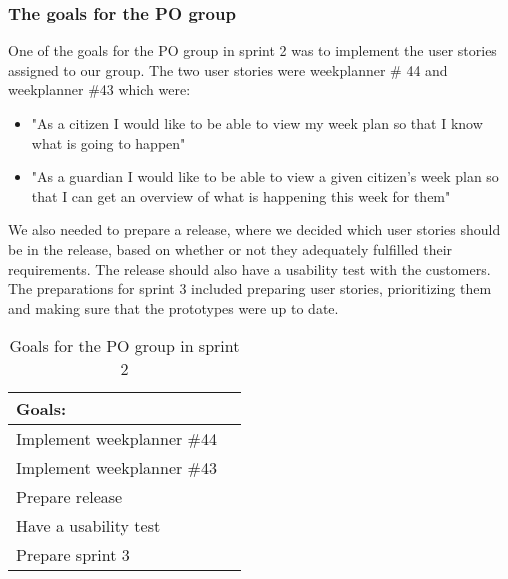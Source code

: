\subsubsection{The goals for the PO group}
One of the goals for the PO group in sprint 2 was to implement the user stories assigned to our group.
The two user stories were weekplanner \# 44 and weekplanner \#43 which were:
\begin{itemize}
 \item "As a citizen I would like to be able to view my week plan so that I know what is going to happen" 
 \item "As a guardian I would like to be able to view a given citizen's week plan so that I can get an overview of what is happening this week for them"
\end{itemize}
We also needed to prepare a release, where we decided which user stories should be in the release, based on whether or not they adequately fulfilled their requirements.
The release should also have a usability test with the customers.
The preparations for sprint 3 included preparing user stories, prioritizing them and making sure that the prototypes were up to date.
\begin{table}[H]
    \centering
    \begin{tabular}{|l|l|}
    \hline
    Goals:                                   \\ \hline
    Implement weekplanner \#44               \\ \hline
    Implement weekplanner \#43               \\ \hline
    Prepare release                          \\ \hline
    Have a usability test                   \\ \hline
    Prepare sprint 3                         \\ \hline
    \end{tabular}
    \caption{Goals for the PO group in sprint 2}
    \label{PO-goal-sprint-2}
\end{table}
